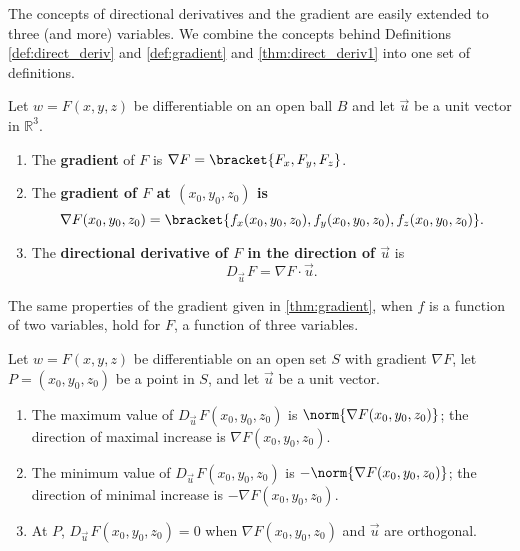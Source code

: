 The concepts of directional derivatives and the gradient are easily extended to three (and more) variables. We combine the concepts behind Definitions \ref{def:direct_deriv} and \ref{def:gradient} and \autoref{thm:direct_deriv1} into one set of definitions.

\begin{definition}\label{def:direct_deriv3}
Let $w=F(x,y,z)$ be differentiable on an open ball $B$ and let $\vec u $ be a unit vector in $\mathbb{R}^3$.
\begin{enumerate}
	\item	The \textbf{gradient} of $F$ is $\nabla F =\bracket{F_x,F_y,F_z}$.
	\item The \textbf{gradient of $F$ at $(x_0,y_0,z_0)$ is
	\[\nabla F(x_0,y_0,z_0) =\bracket{f_x(x_0,y_0,z_0),f_y(x_0,y_0,z_0),f_z(x_0,y_0,z_0)}.\]}
	\item The \textbf{directional derivative of $F$ in the direction of $\vec u$} is
	\[D_{\vec u\,}F=\nabla F\cdot \vec u.\]
\end{enumerate}
\end{definition}

The same properties of the gradient given in \autoref{thm:gradient}, when $f$ is a function of two variables, hold for $F$, a function of three variables.

{
\begin{theorem}\label{thm:gradient3}
Let $w=F(x,y,z)$ be differentiable on an open set $S$ with gradient $\nabla F$, let $P=(x_0,y_0,z_0)$ be a point in $S$, and let $\vec u$ be a unit vector.
\begin{enumerate}
	\item The maximum value of $D_{\vec u\,}F(x_0,y_0,z_0)$ is $\norm{\nabla F(x_0,y_0,z_0)}$; %
	 the direction of maximal increase is $\nabla F(x_0,y_0,z_0)$.
	\item The minimum value of $D_{\vec u\,}F(x_0,y_0,z_0)$ is $-\norm{\nabla F(x_0,y_0,z_0)}$; %
	 the direction of minimal increase is $-\nabla F(x_0,y_0,z_0)$.
	\item At $P$, $D_{\vec u\,}F(x_0,y_0,z_0) = 0$ when $\nabla F(x_0,y_0,z_0)$ and $\vec u$ are orthogonal.
\end{enumerate}
\end{theorem}}

